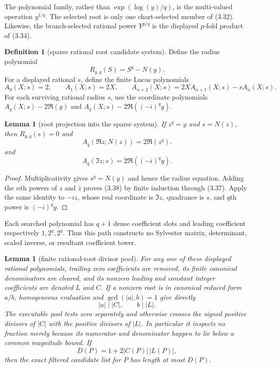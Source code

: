 \documentclass[10pt]{article}
\newtheorem{lemma}[theorem]{Lemma}
\theoremstyle{definition}
\newtheorem{definition}[theorem]{Definition}
\theoremstyle{remark}
\begin{document}
The polynomial family, rather than $\exp(\log(y)/q)$, is the multi-valued
operation $y^{1/q}$.  The selected root is only one chart-selected member of
(3.32).  Likewise, the branch-selected rational power $Y^{p/q}$ is the
displayed $p$-fold product of (3.34).

\begin{definition}[sparse rational root candidate system]
Define the radius polynomial
\[
 R_{y,q}(S)=S^q-N(y).
 \tag{3.36}
\]
For a displayed rational $s$, define the finite Lucas polynomials
\[
 A_0(X;s)=2,\qquad A_1(X;s)=2X,\qquad
 A_{n+2}(X;s)=2X A_{n+1}(X;s)-sA_n(X;s).
 \tag{3.37}
\]
For each surviving rational radius $s$, use the coordinate polynomials
$A_q(X;s)-2\Re(y)$ and $A_q(X;s)-2\Re((-i)^qy)$.
\end{definition}

\begin{lemma}[root projection into the sparse system]
If $z^q=y$ and $s=N(z)$, then $R_{y,q}(s)=0$ and
\[
 A_q(\Re z;N(z))=2\Re(z^q).
 \tag{3.38}
\]
and
\[
 A_q(\Im z;s)=2\Re((-i)^qy).
 \tag{3.39}
\]
\end{lemma}

\begin{proof}
Multiplicativity gives $s^q=N(y)$ and hence the radius equation.  Adding the
$n$th powers of $z$ and $\bar z$ proves (3.38) by finite induction through
(3.37).  Apply the same identity to $-iz$, whose real coordinate is $\Im z$,
quadrance is $s$, and $q$th power is $(-i)^qy$.
\end{proof}

Each searched polynomial has $q+1$ dense coefficient slots and leading
coefficient respectively $1,2^q,2^q$.  Thus this path constructs no
Sylvester matrix, determinant, scaled inverse, or resultant coefficient
tower.

\begin{lemma}[finite rational-root divisor pool]
For any one of these displayed rational
polynomials, trailing zero coefficients are removed, its finite canonical
denominators are cleared, and its nonzero leading and constant integer
coefficients are denoted $L$ and $C$.  If a nonzero root is in canonical
reduced form $a/b$, homogeneous evaluation and $\gcd(|a|,b)=1$ give directly
\[
 |a|\mid |C|,\qquad b\mid |L|.
 \tag{3.40}
\]
The executable pool tests zero separately and otherwise crosses the signed
positive divisors of $|C|$ with the positive divisors of $|L|$.  In
particular it inspects no fraction merely because its numerator and
denominator happen to lie below a common magnitude bound.  If
\[
 D(P)=1+2|C(P)|\,|L(P)|,
 \tag{3.41}
\]
then the exact filtered candidate list for $P$ has length at most $D(P)$.
\end{lemma}
\end{document}
